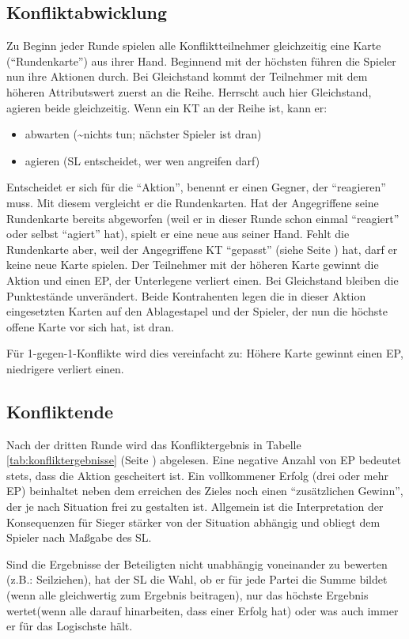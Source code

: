 \subsection {Konfliktabwicklung}
Zu Beginn jeder Runde spielen alle Konfliktteilnehmer gleichzeitig eine Karte ("`Rundenkarte"') aus ihrer Hand. Beginnend mit der höchsten führen die Spieler nun ihre Aktionen durch. Bei Gleichstand kommt der Teilnehmer mit dem höheren Attributswert zuerst an die Reihe. Herrscht auch hier Gleichstand, agieren beide gleichzeitig. Wenn ein KT an der Reihe ist, kann er:
\begin{itemize}
\item abwarten (\textasciitilde nichts tun; nächster Spieler ist dran)
\item agieren (SL entscheidet, wer wen angreifen darf)
\end{itemize}
Entscheidet er sich für die "`Aktion"', benennt er einen Gegner, der "`reagieren"' muss. Mit diesem vergleicht er die Rundenkarten. Hat der Angegriffene seine Rundenkarte bereits abgeworfen (weil er in dieser Runde schon einmal "`reagiert"' oder selbst "`agiert"' hat), spielt er eine neue aus seiner Hand. Fehlt die Rundenkarte aber, weil der Angegriffene KT "`gepasst"' (siehe Seite \pageref {subsect:passen}) hat, darf er keine neue Karte spielen. Der Teilnehmer mit der höheren Karte gewinnt die Aktion und einen EP, der Unterlegene verliert einen. Bei Gleichstand bleiben die Punktestände unverändert. Beide Kontrahenten legen die in dieser Aktion eingesetzten Karten auf den Ablagestapel und der Spieler, der nun die höchste offene Karte vor sich hat, ist dran.

Für 1-gegen-1-Konflikte wird dies vereinfacht zu: Höhere Karte gewinnt einen EP, niedrigere verliert einen.
\subsection {Konfliktende}
Nach der dritten Runde wird das Konfliktergebnis in Tabelle \ref {tab:konfliktergebnisse} (Seite \pageref {tab:konfliktergebnisse}) abgelesen. Eine negative Anzahl von EP bedeutet stets, dass die Aktion gescheitert ist. Ein vollkommener Erfolg (drei oder mehr EP) beinhaltet neben dem erreichen des Zieles noch einen "`zusätzlichen Gewinn"', der je nach Situation frei zu gestalten ist. Allgemein ist die Interpretation der Konsequenzen für Sieger stärker von der Situation abhängig und obliegt dem Spieler nach Maßgabe des SL.

Sind die Ergebnisse der Beteiligten nicht unabhängig voneinander zu bewerten (z.B.: Seilziehen), hat der SL die Wahl, ob er für jede Partei die Summe bildet (wenn alle gleichwertig zum Ergebnis beitragen), nur das höchste Ergebnis wertet(wenn alle darauf hinarbeiten, dass einer Erfolg hat) oder was auch immer er für das Logischste hält.

